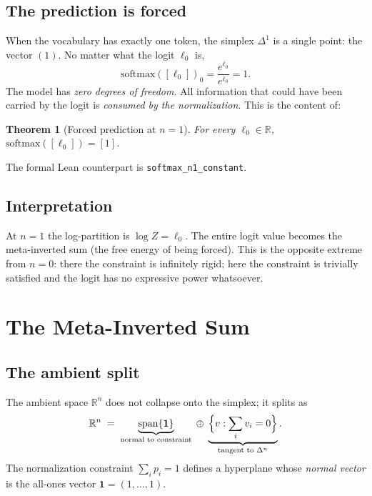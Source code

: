 \documentclass[11pt]{article}
\newtheorem{theorem}{Theorem}[section]
\newcommand{\simplex}[1]{\Delta^{#1}}
\newcommand{\RR}{\mathbb{R}}
\newcommand{\softmax}{\mathrm{softmax}}
\begin{document}
\subsection{The prediction is forced}
\label{sec:n1-forced}

When the vocabulary has exactly one token, the simplex $\simplex{1}$ is a single
point: the vector $(1)$. No matter what the logit $\ell_0$ is,
\[
\softmax([\ell_0])_0 = \frac{e^{\ell_0}}{e^{\ell_0}} = 1.
\]
The model has \emph{zero degrees of freedom}. All information that could have
been carried by the logit is \emph{consumed by the normalization}. This is the
content of:

\begin{theorem}[Forced prediction at $n=1$]
\label{thm:n1}
For every $\ell_0\in\RR$, $\softmax([\ell_0]) = [1]$.
\end{theorem}

\noindent The formal Lean counterpart is \texttt{softmax\_n1\_constant}.

\subsection{Interpretation}
\label{sec:n1-interp}

At $n=1$ the log-partition is $\log Z = \ell_0$. The entire logit value becomes
the meta-inverted sum (the free energy of being forced). This is the opposite
extreme from $n=0$: there the constraint is infinitely rigid; here the
constraint is trivially satisfied and the logit has no expressive power
whatsoever.

\section{The Meta-Inverted Sum}
\label{sec:meta}

\subsection{The ambient split}
\label{sec:meta-split}

The ambient space $\RR^n$ does not collapse onto the simplex; it splits as
\[
\RR^n \;=\; \underbrace{\mathrm{span}\{\mathbf{1}\}}_{\text{normal to constraint}}
\;\oplus\;
\underbrace{\Bigl\{v : \sum_i v_i = 0\Bigr\}}_{\text{tangent to }\simplex{n}}.
\]
The normalization constraint $\sum_i p_i = 1$ defines a hyperplane whose
\emph{normal vector} is the all-ones vector $\mathbf{1} = (1,\dots,1)$.
\end{document}
